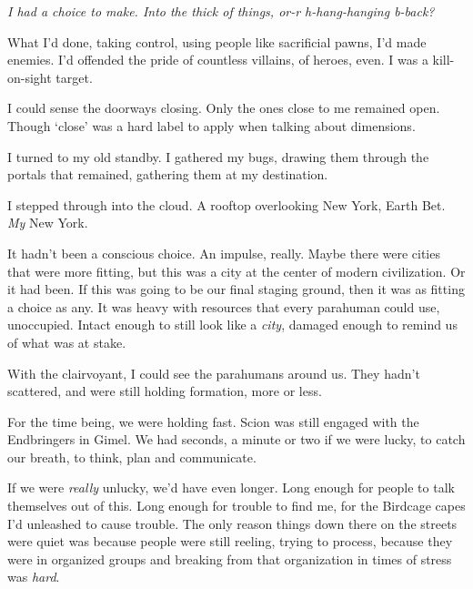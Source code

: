 





\emph{I had a choice to make.  Into the thick of things, or-r h-hang-hanging b-back?}



What I'd done, taking control, using people like sacrificial pawns, I'd made enemies.  I'd offended the pride of countless villains, of heroes, even.  I was a kill-on-sight target.



I could sense the doorways closing.  Only the ones close to me remained open.  Though `close' was a hard label to apply when talking about dimensions.



I turned to my old standby.  I gathered my bugs, drawing them through the portals that remained, gathering them at my destination.



I stepped through into the cloud.  A rooftop overlooking New York, Earth Bet.  \emph{My} New York.



It hadn't been a conscious choice.  An impulse, really.  Maybe there were cities that were more fitting, but this was a city at the center of modern civilization.  Or it had been.  If this was going to be our final staging ground, then it was as fitting a choice as any.  It was heavy with resources that every parahuman could use, unoccupied.  Intact enough to still look like a \emph{city}, damaged enough to remind us of what was at stake.



With the clairvoyant, I could see the parahumans around us.  They hadn't scattered, and were still holding formation, more or less.



For the time being, we were holding fast.  Scion was still engaged with the Endbringers in Gimel.  We had seconds, a minute or two if we were lucky, to catch our breath, to think, plan and communicate.



If we were \emph{really} unlucky, we'd have even longer.  Long enough for people to talk themselves out of this.  Long enough for trouble to find me, for the Birdcage capes I'd unleashed to cause trouble.  The only reason things down there on the streets were quiet was because people were still reeling, trying to process, because they were in organized groups and breaking from that organization in times of stress was \emph{hard}.



